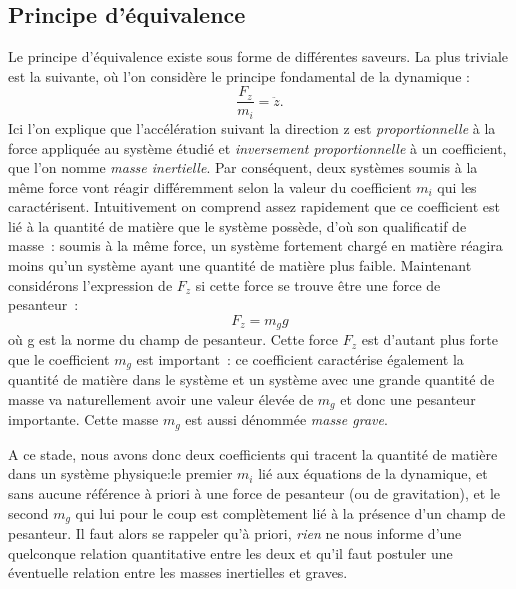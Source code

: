 \subsection{Principe d'équivalence}
Le principe d'équivalence existe sous forme de différentes saveurs. La plus triviale est la suivante, où l'on considère le principe fondamental de la dynamique :
\begin{equation}
\frac{F_z}{m_i}=\ddot z.
\end{equation}
Ici l'on explique que l'accélération suivant la direction z est \textit{proportionnelle} à la force appliquée au système étudié et \textit{inversement proportionnelle} à un coefficient, que l'on nomme \textit{masse inertielle}. Par conséquent, deux systèmes soumis à la même force vont réagir différemment selon la valeur du coefficient $m_i$ qui les caractérisent. Intuitivement on comprend assez rapidement que ce coefficient est lié à la quantité de matière que le système possède, d'où son qualificatif de masse~: soumis à la même force, un système fortement chargé en matière réagira moins qu'un système ayant une quantité de matière plus faible. Maintenant considérons l'expression de $F_z$ si cette force se trouve être une force de pesanteur~:
\begin{equation}
F_z=m_g g
\end{equation}
où g est la norme du champ de pesanteur. Cette force $F_z$ est d'autant plus forte que le coefficient $m_g$ est important~: ce coefficient caractérise également la quantité de matière dans le système et un système avec une grande quantité de masse va naturellement avoir une valeur élevée de $m_g$ et donc une pesanteur importante. Cette masse $m_g$ est aussi dénommée \textit{masse grave}.

A ce stade, nous avons donc deux coefficients qui tracent la quantité de matière dans un système physique:le premier $m_i$ lié aux équations de la dynamique, et sans aucune référence à priori à une force de pesanteur (ou de gravitation),  et le second $m_g$ qui lui pour le coup est complètement lié à la présence d'un champ de pesanteur. Il faut alors se rappeler qu'à priori, \textit{rien} ne nous informe d'une quelconque relation quantitative entre les deux et qu'il faut postuler une éventuelle relation entre les masses inertielles et graves.

